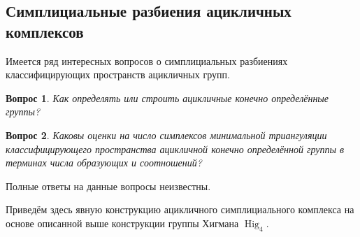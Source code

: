 \documentclass[14pt, dvipsnames]{extarticle}
\newtheorem{question}{\sc Вопрос}
\theoremstyle{definition}
\theoremstyle{remark}
\DeclareMathOperator{\Hig}{\mathrm{Hig}}
\begin{document}
 

\subsection{Симплициальные разбиения ацикличных комплексов}


Имеется ряд интересных вопросов о симплициальных разбиениях классифицирующих пространств ацикличных групп.

\begin{question}
Как определять или строить ацикличные конечно определённые группы?
\end{question}


\begin{question}
Каковы оценки на число симплексов минимальной триангуляции классифицирующего пространства ацикличной конечно определённой группы в терминах числа образующих и соотношений?
\end{question}


Полные ответы на данные вопросы неизвестны.

Приведём здесь явную конструкцию ацикличного симплициального комплекса на основе описанной выше конструкции группы Хигмана $\Hig_4$.
\end{document}

